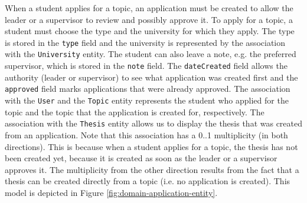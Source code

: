 When a student applies for a topic, an application must be created to allow the leader or a supervisor to review and possibly approve it. To apply for a topic, a student must choose the type and the university for which they apply. The type is stored in the \texttt{type} field and the university is represented by the association with the \texttt{University} entity. The student can also leave a note, e.g. the preferred supervisor, which is stored in the \texttt{note} field. The \texttt{dateCreated} field allows the authority (leader or supervisor) to see what application was created first and the \texttt{approved} field marks applications that were already approved. The association with the \texttt{User} and the \texttt{Topic} entity represents the student who applied for the topic and the topic that the application is created for, respectively. The association with the \texttt{Thesis} entity allows us to display the thesis that was created from an application. Note that this association has a 0..1 multiplicity (in both directions). This is because when a student applies for a topic, the thesis has not been created yet, because it is created as soon as the leader or a supervisor approves it. The multiplicity from the other direction results from the fact that a thesis can be created directly from a topic (i.e. no application is created). This model is depicted in Figure \ref{fig:domain-application-entity}.

